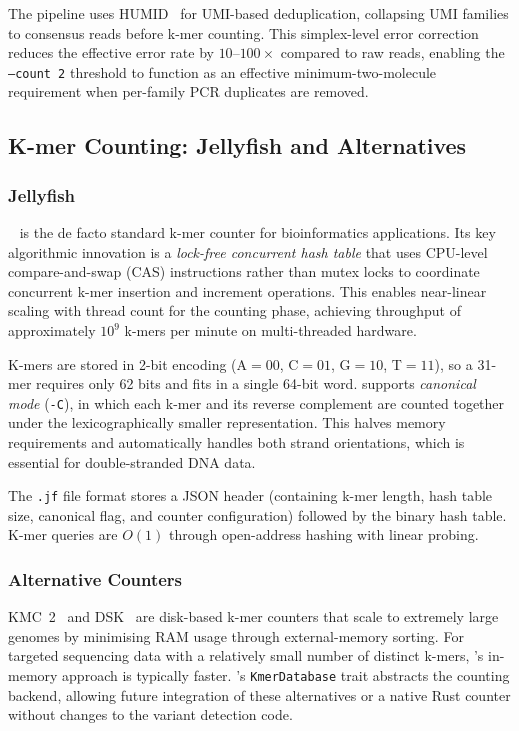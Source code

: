 The \kam{} pipeline uses HUMID~\cite{pockrandt2020humid} for UMI-based
deduplication, collapsing UMI families to consensus reads before k-mer counting.
This simplex-level error correction reduces the effective error rate by $10\text{--}100\times$
compared to raw reads, enabling the \texttt{--count 2} threshold to function as
an effective minimum-two-molecule requirement when per-family PCR duplicates are
removed.

\subsection{K-mer Counting: Jellyfish and Alternatives}

\subsubsection{Jellyfish}

\jf{}~\cite{marcais2011fast} is the de facto standard k-mer counter for
bioinformatics applications.  Its key algorithmic innovation is a \emph{lock-free
concurrent hash table} that uses CPU-level compare-and-swap (CAS) instructions
rather than mutex locks to coordinate concurrent k-mer insertion and increment
operations.  This enables near-linear scaling with thread count for the counting
phase, achieving throughput of approximately $10^9$ k-mers per minute on
multi-threaded hardware.

K-mers are stored in 2-bit encoding (A$=00$, C$=01$, G$=10$, T$=11$), so a
31-mer requires only 62 bits and fits in a single 64-bit word.  \jf{} supports
\emph{canonical mode} (\texttt{-C}), in which each k-mer and its reverse
complement are counted together under the lexicographically smaller representation.
This halves memory requirements and automatically handles both strand
orientations, which is essential for double-stranded DNA data.

The \texttt{.jf} file format stores a JSON header (containing k-mer length, hash
table size, canonical flag, and counter configuration) followed by the binary
hash table.  K-mer queries are $O(1)$ through open-address hashing with linear
probing.

\subsubsection{Alternative Counters}

KMC~2~\cite{deorowicz2015kmc2} and DSK~\cite{rizk2013dsk} are disk-based k-mer
counters that scale to extremely large genomes by minimising RAM usage through
external-memory sorting.  For targeted sequencing data with a relatively small
number of distinct k-mers, \jf{}'s in-memory approach is typically faster.
\kmerdet{}'s \texttt{KmerDatabase} trait abstracts the counting backend, allowing
future integration of these alternatives or a native Rust counter without changes
to the variant detection code.

